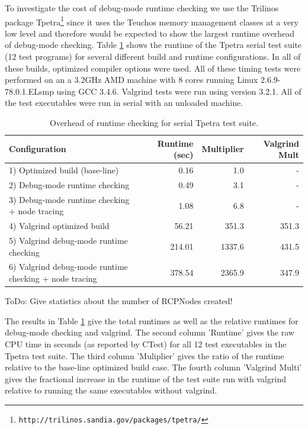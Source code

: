 \documentclass[pdf,ps2pdf,11pt]{SANDreport}
\begin{document}
To investigate the cost of debug-mode runtime checking we use the
Trilinos package
Tpetra\footnote{{}\texttt{http://trilinos.sandia.gov/packages/tpetra/}}
since it uses the Teuchos memory management classes at a very low
level and therefore would be expected to show the largest runtime
overhead of debug-mode checking.  Table
{}\ref{tbl:overhead-of-runtime-checking} shows the runtime of the
Tpetra serial test suite (12 test programs) for several different
build and runtime configurations.  In all of these builds, optimized
compiler options were used.  All of these timing tests were performed
on an a 3.2GHz AMD machine with 8 cores running Linux
2.6.9-78.0.1.ELsmp using GCC 3.4.6.  Valgrind tests were run using
version 3.2.1.  All of the test executables were run in serial with an
unloaded machine.

\begin{table}
%
\begin{center}
%
{\small\begin{tabular}{|l|r|r|r|}
\hline
Configuration
& Runtime (sec)
& Multiplier
& Valgrind Mult \\
\hline
\hline
1) Optimized build (base-line)
& 0.16
& 1.0
& - \\
\hline
2) Debug-mode runtime checking
& 0.49
& 3.1
& - \\
\hline
3) Debug-mode runtime checking + node tracing
& 1.08
& 6.8
& - \\
\hline
4) Valgrind optimized build
& 56.21
& 351.3
& 351.3 \\
\hline
5) Valgrind debug-mode runtime checking
& 214.01
& 1337.6
& 431.5 \\
\hline
6) Valgrind debug-mode runtime checking + node tracing
& 378.54
& 2365.9
& 347.9 \\
\hline
\end{tabular}}
%
\end{center}
%
\caption{\label{tbl:overhead-of-runtime-checking}
Overhead of runtime checking for serial Tpetra test suite.}
%
\end{table}

ToDo: Give statistics about the number of RCPNodes created!

The results in Table {}\ref{tbl:overhead-of-runtime-checking} give the
total runtimes as well as the relative runtimes for debug-mode
checking and valgrind.  The second column 'Runtime' gives the raw CPU
time in seconds (as reported by CTest) for all 12 test executables in
the Tpetra test suite.  The third column 'Muliplier' gives the ratio
of the runtime relative to the base-line optimized build case.  The
fourth column 'Valgrind Multi' gives the fractional increase in the
runtime of the test suite run with valgrind relative to running the
same executables without valgrind.
\end{document}
